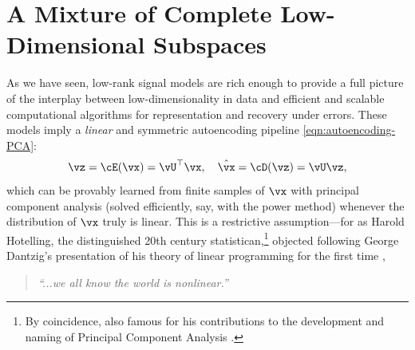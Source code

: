 \documentclass[../../book-main.tex]{subfiles}
\begin{document}


\section{A Mixture of Complete Low-Dimensional Subspaces}%
\label{sec:ica}
As we have seen, low-rank signal models are rich enough to provide a full picture of the interplay between low-dimensionality in data and efficient and scalable computational algorithms for representation and recovery under errors. 
These models imply a \textit{linear} and symmetric autoencoding pipeline \eqref{eqn:autoencoding-PCA}: 
\begin{equation*}
    \vz = \cE(\vx) = \vU^\top \vx, \quad \hat{\vx} = \cD(\vz) = \vU \vz,
\end{equation*}
which can be provably learned from finite samples of $\vx$ with principal component analysis (solved efficiently, say, with the power method) whenever the distribution of $\vx$ truly is linear.
This is a restrictive assumption---for as Harold Hotelling, the distinguished 20th century statistican,\footnote{By coincidence, also famous for his contributions to the development and naming of Principal Component Analysis \cite{Hotelling1933}.} objected following George Dantzig's presentation of his theory of linear programming for the first time \cite{Dantzig2002-eh},
\begin{quote}
\centering
    \textit{``...we all know the world is nonlinear.''}
\end{quote}
\end{document}
